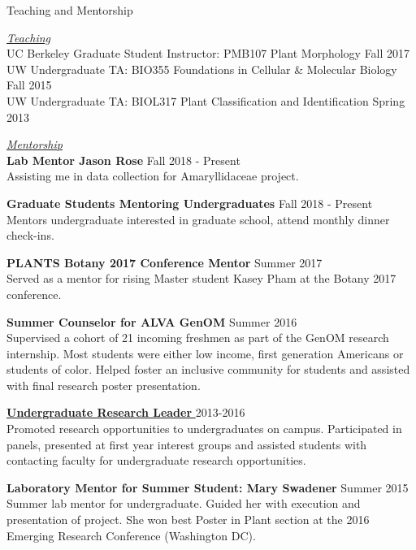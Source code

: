 \documentclass{resume} %
\begin{document}
\newpage
\begin{rSection}{Teaching and Mentorship}

\underline{\textit{Teaching}} \\
UC Berkeley Graduate Student Instructor: PMB107 Plant Morphology \hfill	Fall 2017\\
UW Undergraduate TA: BIO355 Foundations in Cellular \& Molecular Biology	\hfill Fall 2015\\   
UW Undergraduate TA: BIOL317 Plant Classification and Identification \hfill Spring 2013

\underline{\textit{Mentorship}}\\
\textbf{Lab Mentor Jason Rose} \hfill Fall 2018 - Present\\
Assisting me in data collection for Amaryllidaceae project.

\textbf{Graduate Students Mentoring Undergraduates} \hfill Fall 2018 - Present\\
Mentors undergraduate interested in graduate school, attend monthly dinner check-ins. 

\textbf{PLANTS Botany 2017 Conference Mentor} \hfill Summer 2017 \\
Served as a mentor for rising Master student Kasey Pham at the Botany 2017 conference. 

\textbf{Summer Counselor for ALVA GenOM }\hfill Summer 2016\\
Supervised a cohort of 21 incoming freshmen as part of the GenOM 
research internship. Most students were either low income, first generation Americans or students of color. Helped foster an inclusive community for students and assisted with final research poster presentation.  

\href{https://www.washington.edu/undergradresearch/jesus-martinez-gomez/}{\textbf{Undergraduate Research Leader} } \hfill 2013-2016 \\
Promoted research opportunities to undergraduates on campus. Participated
in  panels, presented at first year interest groups and assisted students with contacting faculty for undergraduate research opportunities. 

\textbf{Laboratory Mentor for Summer Student: Mary Swadener} \hfill Summer 2015\\
Summer lab mentor for undergraduate. Guided her with execution and  
presentation of project. She won best Poster in Plant section at the  
2016 Emerging Research Conference (Washington DC).


\end{rSection}
\end{document}
